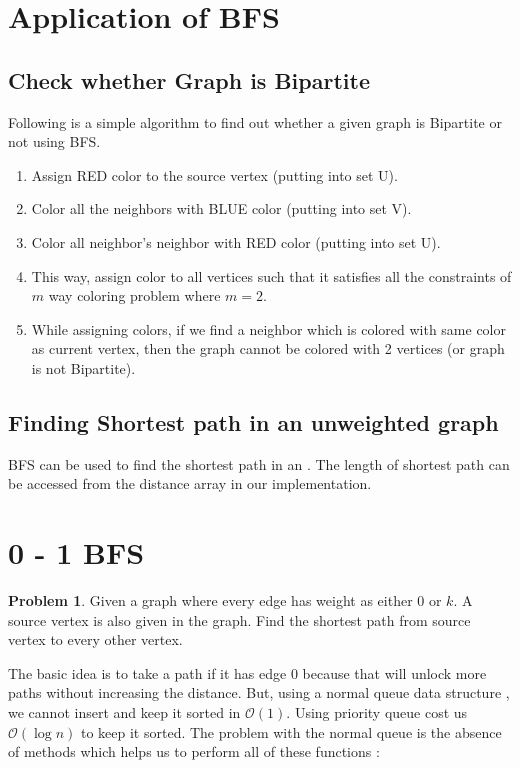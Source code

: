 \documentclass[twoside,12pt,a4paper,english]{book}
\theoremstyle{definition}
\theoremstyle{problemstyle}
\newtheorem*{problem}{Problem} %
\theoremstyle{problemstyle}
\theoremstyle{problemstyle}
\begin{document}
\section{Application of BFS}

\subsection{Check whether Graph is Bipartite}

Following is a simple algorithm to find out whether a given graph is Bipartite or not using BFS.

\begin{enumerate}
    \item Assign RED color to the source vertex (putting into set U).
    \item Color all the neighbors with BLUE color (putting into set V).
    \item Color all neighbor’s neighbor with RED color (putting into set U).
    \item This way, assign color to all vertices such that it satisfies all the constraints of $m$ way coloring problem where $m = 2$.
    \item While assigning colors, if we find a neighbor which is colored with same color as current vertex, then the graph cannot be colored with 2 vertices (or graph is not Bipartite).
\end{enumerate}

\subsection{Finding Shortest path in an unweighted graph}

BFS can be used to find the shortest path in an . The length of shortest path can be accessed from the distance array in our implementation.

\section{0 - 1 BFS}

\begin{problem}
  Given a graph where every edge has weight as either $0$ or $k$. A source vertex is also given in the graph. Find the shortest path from source vertex to every other vertex.
\end{problem}

The basic idea is to take a path if it has edge 0 because that will unlock more paths without increasing the distance. But, using a normal queue data structure , we cannot insert and keep it sorted in $\mathcal{O}(1)$. Using priority queue cost us $\mathcal{O}(\log{n})$ to keep it sorted. The problem with the normal queue is the absence of methods which helps us to perform all of these functions :
\end{document}
